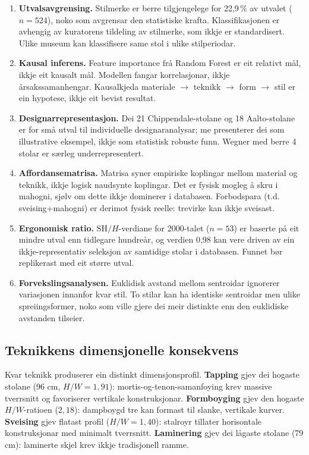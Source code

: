 \documentclass[10pt, a4paper, twocolumn]{article}
\begin{document}
\begin{enumerate}
  \item \textbf{Utvalsavgrensing.} Stilmerke er berre tilgjengelege for 22,9\,\% av utvalet ($n = 524$), noko som avgrensar den statistiske krafta. Klassifikasjonen er avhengig av kuratorens tildeling av stilmerke, som ikkje er standardisert. Ulike museum kan klassifisere same stol i ulike stilperiodar.

  \item \textbf{Kausal inferens.} Feature importance frå Random Forest er eit relativt mål, ikkje eit kausalt mål. Modellen fangar korrelasjonar, ikkje årsakssamanhengar. Kausalkjeda materiale $\rightarrow$ teknikk $\rightarrow$ form $\rightarrow$ stil er ein hypotese, ikkje eit bevist resultat.

  \item \textbf{Designarrepresentasjon.} Dei 21 Chippendale-stolane og 18 Aalto-stolane er for små utval til individuelle designaranalysar; me presenterer dei som illustrative eksempel, ikkje som statistisk robuste funn. Wegner med berre 4 stolar er særleg underrepresentert.

  \item \textbf{Affordansematrisa.} Matrisa syner empiriske koplingar mellom material og teknikk, ikkje logisk naudsynte koplingar. Det er fysisk mogleg å skru i mahogni, sjølv om dette ikkje dominerer i databasen. Forbodspara (t.d. sveising+mahogni) er derimot fysisk reelle: trevirke kan ikkje sveisast.

  \item \textbf{Ergonomisk ratio.} $\text{SH}/H$-verdiane for 2000-talet ($n = 53$) er baserte på eit mindre utval enn tidlegare hundreår, og verdien 0,98 kan vere driven av ein ikkje-representativ seleksjon av samtidige stolar i databasen. Funnet bør replikerast med eit større utval.

  \item \textbf{Forvekslingsanalysen.} Euklidisk avstand mellom sentroidar ignorerer variasjonen innanfor kvar stil. To stilar kan ha identiske sentroidar men ulike spreiingsformer, noko som ville gjere dei meir distinkte enn den euklidiske avstanden tilseier.
\end{enumerate}


\subsection{Teknikkens dimensjonelle konsekvens}

Kvar teknikk produserer ein distinkt dimensjonsprofil. \textbf{Tapping} gjev dei hogaste stolane (96 cm, $H/W = 1{,}91$): mortis-og-tenon-samanfoying krev massive tverrsnitt og favoriserer vertikale konstruksjonar. \textbf{Formboyging} gjev den hogaste $H/W$-ratioen ($2{,}18$): dampboygd tre kan formast til slanke, vertikale kurver. \textbf{Sveising} gjev flatast profil ($H/W = 1{,}40$): stalroyr tillater horisontale konstruksjonar med minimalt tverrsnitt. \textbf{Laminering} gjev dei lågaste stolane (79 cm): laminerte skjel krev ikkje tradisjonell ramme.
\end{document}
